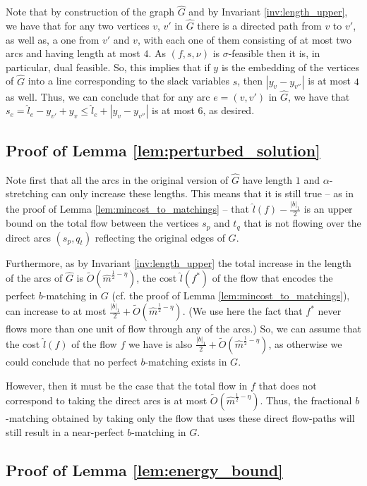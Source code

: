 \documentclass[11pt, letterpaper]{article}
\newcommand{\onorm}[1]{|#1|_{1}}
\newcommand{\tO}[1]{\widetilde{O}(#1)}
\newcommand{\hG}{\widehat{G}}
\newcommand{\hm}{\widehat{m}}
\newcommand{\hl}{\hat{l}}
\newcommand{\vnu}{\boldsymbol{\mathit{\nu}}}
\newcommand{\vsigma}{\boldsymbol{\mathit{\sigma}}}
\newcommand{\bb}{\boldsymbol{\mathit{b}}}
\newcommand{\ff}{\boldsymbol{\mathit{f}}}
\newcommand{\hll}{\boldsymbol{\mathit{\hat{l}}}}
\renewcommand{\ss}{\boldsymbol{\mathit{s}}}
\newcommand{\yy}{\boldsymbol{\mathit{y}}}
\begin{document}
Note that by construction of the graph $\hG$ and by Invariant \ref{inv:length_upper}, we have that for any two vertices $v$, $v'$ in $\hG$ there is a directed path from $v$ to $v'$, as well as, a one from $v'$ and $v$, with each one of them consisting of at most two arcs and having length at most $4$. As $(\ff,\ss,\vnu)$ is $\vsigma$-feasible then it is, in particular, dual feasible. So, this implies that if $\yy$ is the embedding of the vertices of $\hG$ into a line corresponding to the slack variables $\ss$, then $|y_{v}-y_{v''}|$ is at most $4$ as well. Thus, we can conclude that for any arc $e=(v,v')$ in $\hG$, we have that $s_e = \hl_e - y_{v'} + y_{v}\leq \hl_e + |y_{v}-y_{v''}|$ is at most $6$, as desired.


\subsection{Proof of Lemma \ref{lem:perturbed_solution}}\label{app:perturbed_solution}


Note first that all the arcs in the original version of $\hG$ have length $1$ and $\alpha$-stretching can only increase these lengths. This means that it is still true -- as in the proof of Lemma \ref{lem:mincost_to_matchings} -- that $\hl(\ff)-\frac{\onorm{\bb}}{2}$ is an upper bound on the total flow between the vertices $s_p$ and $t_q$ that is not flowing over the direct arcs $(s_p,q_t)$ reflecting the original edges of $G$. 

Furthermore, as by Invariant \ref{inv:length_upper} the total increase in the length of the arcs of $\hG$ is $\tO{\hm^{\frac{1}{2}-\eta}}$, the cost $\hll(\ff^*)$ of the flow that encodes the perfect $\bb$-matching in $G$ (cf. the proof of Lemma \ref{lem:mincost_to_matchings}), can increase to at most $\frac{\onorm{\bb}}{2}+\tO{\hm^{\frac{1}{2}-\eta}}$. (We use here the fact that $f^*$ never flows more than one unit of flow through any of the arcs.) So, we can assume that the cost $\hll(\ff)$ of the flow $\ff$ we have is also $\frac{\onorm{\bb}}{2}+\tO{\hm^{\frac{1}{2}-\eta}}$, as otherwise we could conclude that no perfect $\bb$-matching exists in $G$. 

However, then it must be the case that the total flow in $\ff$ that does not correspond to taking the direct arcs is at most $\tO{\hm^{\frac{1}{2}-\eta}}$. Thus, the fractional $\bb$-matching obtained by taking only the flow that uses these direct flow-paths will still result in a near-perfect $\bb$-matching in $G$. 


\subsection{Proof of Lemma \ref{lem:energy_bound}}\label{app:energy_bound}
\end{document}
